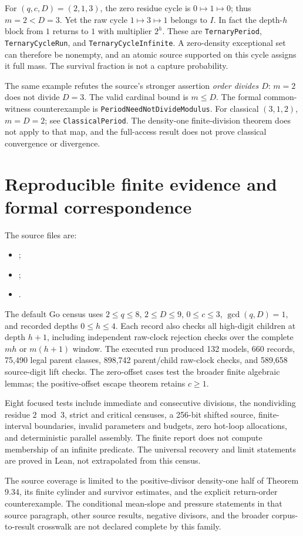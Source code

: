 \documentclass[11pt,letterpaper]{article}
\begin{document}
For \((q,c,D)=(2,1,3)\), the zero residue cycle is
\(0\mapsto1\mapsto0\); thus \(m=2<D=3\).
Yet the raw cycle \(1\mapsto3\mapsto1\) belongs to \(I\).
In fact the depth-\(h\) block from \(1\) returns to \(1\) with multiplier \(2^h\).
These are \texttt{TernaryPeriod}, \texttt{TernaryCycleRun},
and \texttt{TernaryCycleInfinite}.
A zero-density exceptional set can therefore be nonempty, and an atomic
source supported on this cycle assigns it full mass.
The survival fraction is not a capture probability.

The same example refutes the source's stronger assertion
\emph{order divides \(D\)}: \(m=2\) does not divide \(D=3\).
The valid cardinal bound is \(m\le D\).
The formal common-witness counterexample is
\texttt{PeriodNeedNotDivideModulus}.
For classical \((3,1,2)\), \(m=D=2\); see \texttt{ClassicalPeriod}.
The density-one finite-division theorem does not apply to that map,
and the full-access result does not prove classical convergence or divergence.

\section{Reproducible finite evidence and formal correspondence}

The source files are:
\begin{itemize}
\item {};
\item {};
\item {}.
\end{itemize}
The default Go census uses \(2\le q\le8\), \(2\le D\le9\),
\(0\le c\le3\), \(\gcd(q,D)=1\), and recorded depths \(0\le h\le4\).
Each record also checks all high-digit children at depth \(h+1\), including
independent raw-clock rejection checks over the complete \(mh\) or \(m(h+1)\) window.
The executed run produced 132 models, 660 records, 75,490 legal parent classes,
898,742 parent/child raw-clock checks, and 589,658 source-digit lift checks.
The zero-offset cases test the broader finite algebraic lemmas;
the positive-offset escape theorem retains \(c\ge1\).

Eight focused tests include immediate and consecutive divisions,
the nondividing residue \(2\bmod3\), strict and critical censuses,
a 256-bit shifted source, finite-interval boundaries, invalid parameters and
budgets, zero hot-loop allocations, and deterministic parallel assembly.
The finite report does not compute membership of an infinite predicate.
The universal recovery and limit statements are proved in Lean,
not extrapolated from this census.

The source coverage is limited to the positive-divisor density-one half
of Theorem 9.34, its finite cylinder and survivor estimates, and the explicit
return-order counterexample.
The conditional mean-slope and pressure statements in that source paragraph,
other source results, negative divisors, and the broader corpus-to-result
crosswalk are not declared complete by this family.



\end{document}
